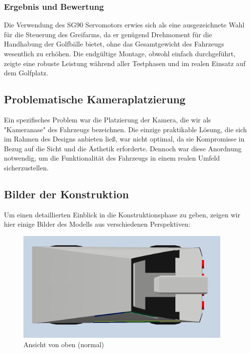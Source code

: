 \subsubsection{Ergebnis und Bewertung}
Die Verwendung des SG90 Servomotors erwies sich als eine ausgezeichnete Wahl für die Steuerung des Greifarms, da er genügend Drehmoment für die Handhabung der Golfbälle bietet, ohne das Gesamtgewicht des Fahrzeugs wesentlich zu erhöhen. Die endgültige Montage, obwohl einfach durchgeführt, zeigte eine robuste Leistung während aller Testphasen und im realen Einsatz auf dem Golfplatz.

\subsection{Problematische Kameraplatzierung}
Ein spezifisches Problem war die Platzierung der Kamera, die wir als "Kameranase" des Fahrzeugs bezeichnen. Die einzige praktikable Lösung, die sich im Rahmen des Designs anbieten ließ, war nicht optimal, da sie Kompromisse in Bezug auf die Sicht und die Ästhetik erforderte. Dennoch war diese Anordnung notwendig, um die Funktionalität des Fahrzeugs in einem realen Umfeld sicherzustellen.

\subsection{Bilder der Konstruktion}
Um einen detaillierten Einblick in die Konstruktionsphase zu geben, zeigen wir hier einige Bilder des Modells aus verschiedenen Perspektiven:

\newpage

\begin{figure}[h]
    \centering
    \includegraphics[width=0.95\textwidth]{Resources/oben_normal.png}
    \caption{Ansicht von oben (normal)}
\end{figure}


